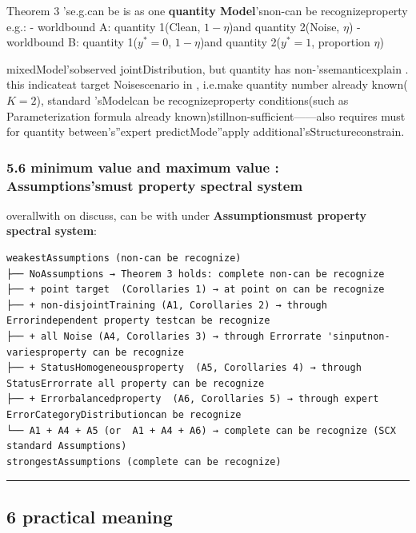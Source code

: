 \documentclass[
  12pt,
]{article}
\begin{document}
Theorem 3 'se.g.can be is as one \textbf{quantity Model}'snon-can be recognizeproperty e.g.:  -
worldbound  A: quantity  1(Clean,  \(1-\eta\))and quantity  2(Noise,  \(\eta\)) -
worldbound  B: quantity  1(\(y^*=0\),  \(1-\eta\))and quantity  2(\(y^*=1\), proportion
\(\eta\))

mixedModel'sobserved jointDistribution, but quantity has non-'ssemanticexplain . this indicateat target Noisescenario in , i.e.make quantity number already known(\(K=2\)), standard 'sModelcan be recognizeproperty conditions(such as Parameterization formula already known)stillnon-sufficient------also requires must for quantity between's''expert predictMode''apply additional'sStructureconstrain. 

\subsubsection{5.6
minimum value and maximum value : Assumptions'smust property spectral system}\label{ux6700ux5c0fux503cux4e0eux6700ux5927ux503cux5047ux8bbeux7684ux5fc5ux8981ux6027ux8c31ux7cfb}

overallwith on discuss, can be with under \textbf{Assumptionsmust property spectral system}: 

\begin{verbatim}
weakestAssumptions (non-can be recognize)
├── NoAssumptions → Theorem 3 holds: complete non-can be recognize
├── + point target  (Corollaries 1) → at point on can be recognize
├── + non-disjointTraining (A1, Corollaries 2) → through Errorindependent property testcan be recognize
├── + all Noise (A4, Corollaries 3) → through Errorrate 'sinputnon-variesproperty can be recognize
├── + StatusHomogeneousproperty  (A5, Corollaries 4) → through StatusErrorrate all property can be recognize
├── + Errorbalancedproperty  (A6, Corollaries 5) → through expert ErrorCategoryDistributioncan be recognize
└── A1 + A4 + A5 (or  A1 + A4 + A6) → complete can be recognize (SCX standard Assumptions)
strongestAssumptions (complete can be recognize)
\end{verbatim}

\begin{center}\rule{0.5\linewidth}{0.5pt}\end{center}

\subsection{6 practical meaning}\label{ux5b9eux9645ux610fux4e49}
\end{document}
